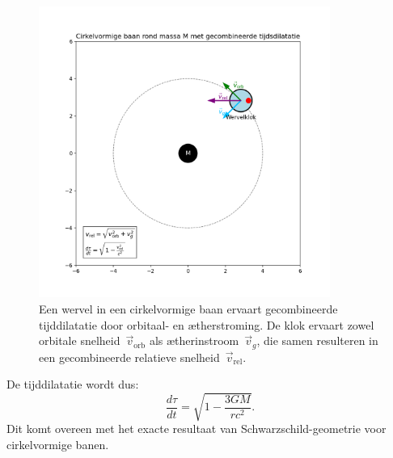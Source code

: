 \begin{figure}[htbp]
    \centering
    \includegraphics[width=0.85\textwidth]{images/08-BaanRondMassa_nl}
    \caption{Een wervel in een cirkelvormige baan ervaart gecombineerde tijddilatatie door orbitaal- en ætherstroming. De klok ervaart zowel orbitale snelheid~$\vec{v}_{\mathrm{orb}}$ als ætherinstroom~$\vec{v}_g$, die samen resulteren in een gecombineerde relatieve snelheid~$\vec{v}_{\mathrm{rel}}$.}
    \label{fig:BaanRondMassa}
\end{figure}

De tijddilatatie wordt dus:
\[
    \frac{d\tau}{dt} = \sqrt{1 - \frac{3GM}{rc^2}}. \tag{6}
\]
Dit komt overeen met het exacte resultaat van Schwarzschild-geometrie voor cirkelvormige banen.

